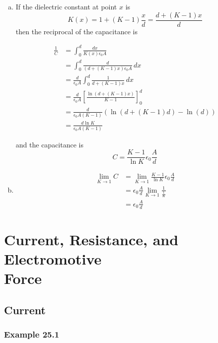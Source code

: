 \documentclass{article}
\begin{document}
\begin{enumerate}[(a)]
  \item If the dielectric constant at point $x$ is \[K(x) = 1 + (K - 1) \frac{x}{d} = \frac{d + (K - 1) x}{d}\] then the reciprocal of the capacitance is

        \begin{align*}
          \frac{1}{C} & = \int_0^d \frac{dx}{K(x) \epsilon_0 A}                                       \\
                      & = \int_0^d \frac{d}{(d + (K - 1) x) \epsilon_0 A} \,dx                        \\
                      & = \frac{d}{\epsilon_0 A} \int_0^d \frac{1}{d + (K - 1) x} \,dx                \\
                      & = \frac{d}{\epsilon_0 A} \left[ \frac{\ln (d + (K - 1) x)}{K - 1} \right]_0^d \\
                      & = \frac{d}{\epsilon_0 A (K - 1)} (\ln (d + (K - 1) d) - \ln (d))              \\
                      & = \frac{d \ln K}{\epsilon_0 A (K - 1)}
        \end{align*}

        and the capacitance is \[C = \frac{K - 1}{\ln K} \epsilon_0 \frac{A}{d}\]

  \item

        \begin{align*}
          \lim_{K \rightarrow 1} C & = \lim_{K \rightarrow 1} \frac{K - 1}{\ln K} \epsilon_0 \frac{A}{d}   \\
                                   & = \epsilon_0 \frac{A}{d} \lim_{K \rightarrow 1} \frac{1}{\frac{1}{K}} \\
                                   & = \epsilon_0 \frac{A}{d}
        \end{align*}
\end{enumerate}

\section{Current, Resistance, and Electromotive \\ Force}

\subsection{Current}

\subsubsection{Example 25.1}
\end{document}

